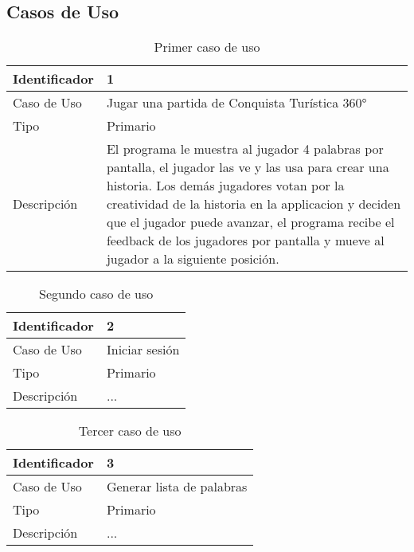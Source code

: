 \subsection{Casos de Uso}
\begin{table}[H]
    \begin{center}
        \begin{tabular}{| l | m{12cm} |}        
        	\hline 
        	Identificador & 1\\
        	\hline
        	Caso de Uso & Jugar una partida de Conquista Turística
360°\\
        	\hline
        	Tipo & Primario\\
        	\hline
        	Descripción & El programa le muestra al jugador 4 palabras por pantalla, el jugador las ve y las usa para crear una historia. Los demás jugadores votan por la creatividad de la historia en la applicacion y deciden que el jugador puede avanzar, el programa recibe el feedback de los jugadores por pantalla y mueve al jugador a la siguiente posición.\\
        	\hline
        \end{tabular}
    \caption{Primer caso de uso}
    \end{center}
\end{table}

\begin{table}[H]
    \begin{center}
        \begin{tabular}{| l | m{12cm} |}        
        	\hline 
        	Identificador & 2\\
        	\hline
        	Caso de Uso & Iniciar sesión\\
        	\hline
        	Tipo & Primario\\
        	\hline
        	Descripción & ...\\
        	\hline
        \end{tabular}
    \caption{Segundo caso de uso}
    \end{center}
\end{table}

\begin{table}[H]
    \begin{center}
        \begin{tabular}{| l | m{12cm} |}        
        	\hline 
        	Identificador & 3\\
        	\hline
        	Caso de Uso & Generar lista de palabras\\
        	\hline
        	Tipo & Primario\\
        	\hline
        	Descripción & ...\\
        	\hline
        \end{tabular}
    \caption{Tercer caso de uso}
    \end{center}
\end{table}

